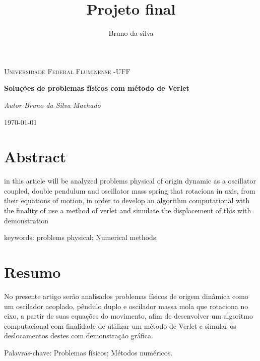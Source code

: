 \documentclass[a4paper]{article} %
\begin{document}

\title{Projeto final}
\author{Bruno da silva}

\selectfont
\begin{titlepage}
	\begin{center}
		{\scshape\Large Universidade Federal Fluminense -UFF \par}
		\vspace{7cm}
		{\huge\bfseries Soluções de problemas físicos com método de Verlet  \par}
		\vspace{5.5cm}
		{\itshape Autor Bruno da Silva Machado \par}      
		
		\vspace{6.5cm}    
		
		\vfill
		{\large \today\par}
	\end{center}
\end{titlepage}

\tableofcontents{}

\newpage

\section*{Abstract}
\noindent

in this article will be analyzed problems physical of origin dynamic as a oscillator coupled, double pendulum and oscillator mass spring that rotaciona in axis, from their equations of motion, in order to develop an algorithm computational with the finality of use a method of verlet and simulate the displacement of this with demonstration

keywords: problems physical; Numerical methods.

\section*{Resumo}

No presente artigo serão analisados problemas físicos de origem dinâmica como um oscilador acoplado, pêndulo duplo e oscilador massa mola que rotaciona no eixo, a partir de suas equações do movimento, afim de desenvolver um algoritmo computacional com finalidade de utilizar um método de Verlet e simular os deslocamentos destes com demonstração gráfica.

Palavras-chave: Problemas físicos; M\'{e}todos num\'{e}ricos.
\end{document}
